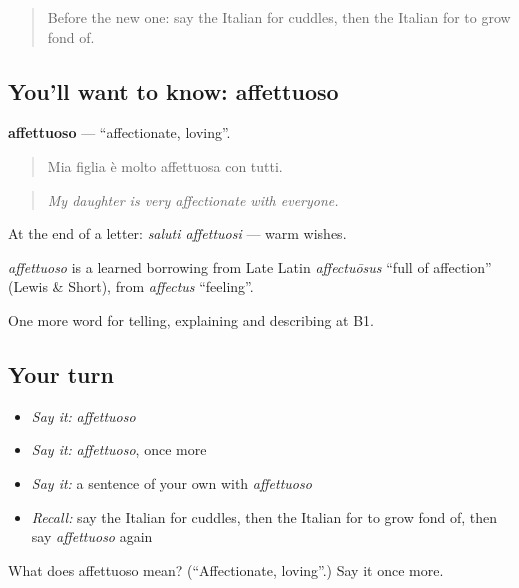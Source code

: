 \begin{quote}
Before the new one: say the Italian for cuddles, then the Italian for to grow fond of.
\end{quote}

\subsection*{You'll want to know: affettuoso}
\textbf{affettuoso} — \textquotedblleft{}affectionate, loving\textquotedblright{}.

\begin{quote}
Mia figlia è molto affettuosa con tutti.
\end{quote}

\begin{quote}
\emph{My daughter is very affectionate with everyone.}
\end{quote}

At the end of a letter: \emph{saluti affettuosi} — warm wishes.

\begin{cousinweb}
\emph{affettuoso} is a learned borrowing from Late Latin \emph{affectuōsus} \textquotedblleft{}full of affection\textquotedblright{} (Lewis \& Short), from \emph{affectus} \textquotedblleft{}feeling\textquotedblright{}.
\end{cousinweb}

\begin{grammarlens}[title={What you've built}]
One more word for telling, explaining and describing at B1.
\end{grammarlens}

\subsection*{Your turn}
\begin{itemize}
\raggedright
  \item \emph{Say it:} \emph{affettuoso}
  \item \emph{Say it:} \emph{affettuoso}, once more
  \item \emph{Say it:} a sentence of your own with \emph{affettuoso}
  \item \emph{Recall:} say the Italian for cuddles, then the Italian for to grow fond of, then say \emph{affettuoso} again
\end{itemize}

\begin{tcolorbox}[breakable,colback=teal!4,colframe=teal!35!black,title={Before you move on}]
What does affettuoso mean? (\textquotedblleft{}Affectionate, loving\textquotedblright{}.) Say it once more.
\end{tcolorbox}

